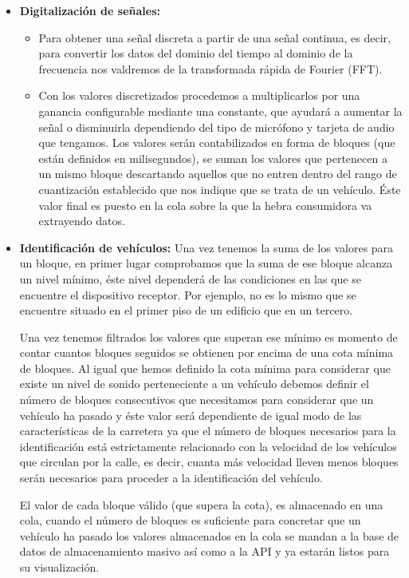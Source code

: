 \begin{itemize}
  \item \textbf{Digitalización de señales: }

    \begin{itemize}
      \item Para obtener una señal discreta a partir de una señal continua, es decir, para convertir los datos del dominio del tiempo al dominio de la frecuencia nos valdremos de la transformada rápida de Fourier (FFT).
      \item Con los valores discretizados procedemos a multiplicarlos por una ganancia configurable mediante una constante, que ayudará a aumentar la señal o disminuirla dependiendo del tipo de micrófono y tarjeta de audio que tengamos. Los valores serán contabilizados en forma de bloques (que están definidos en milisegundos), se suman los valores que pertenecen a un mismo bloque descartando aquellos que no entren dentro del rango de cuantización establecido que nos indique que se trata de un vehículo. Éste valor final es puesto en la cola sobre la que la hebra consumidora va extrayendo datos.
    \end{itemize}

  \item \textbf{Identificación de vehículos:} Una vez tenemos la suma de los valores para un bloque, en primer lugar comprobamos que la suma de ese bloque alcanza un nivel mínimo, éste nivel dependerá de las condiciones en las que se encuentre el dispositivo receptor. Por ejemplo, no es lo mismo que se encuentre situado en el primer piso de un edificio que en un tercero.

  Una vez tenemos filtrados los valores que superan ese mínimo es momento de contar cuantos bloques seguidos se obtienen por encima de una cota mínima de bloques. Al igual que hemos definido la cota mínima para considerar que existe un nivel de sonido perteneciente a un vehículo debemos definir el número de bloques consecutivos que necesitamos para considerar que un vehículo ha pasado y éste valor será dependiente de igual modo de las características de la carretera ya que el número de bloques necesarios para la identificación está estrictamente relacionado con la velocidad de los vehículos que circulan por la calle, es decir, cuanta más velocidad lleven menos bloques serán necesarios para proceder a la identificación del vehículo.

  El valor de cada bloque válido (que supera la cota), es almacenado en una cola, cuando el número de bloques es suficiente para concretar que un vehículo ha pasado los valores almacenados en la cola se mandan a la base de datos de almacenamiento masivo así como a la API y ya estarán listos para su visualización.


\end{itemize}
